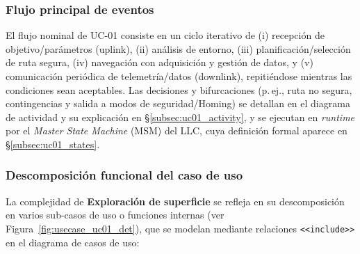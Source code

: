 \subsubsection{Flujo principal de eventos}\label{subsec:uc01_flow}

El flujo nominal de UC-01 consiste en un ciclo iterativo de (i) recepción de objetivo/parámetros (uplink), (ii) análisis de entorno, (iii) planificación/selección de ruta segura, (iv) navegación con adquisición y gestión de datos, y (v) comunicación periódica de telemetría/datos (downlink), repitiéndose mientras las condiciones sean aceptables. Las decisiones y bifurcaciones (p.\,ej., ruta no segura, contingencias y salida a modos de seguridad/Homing) se detallan en el diagrama de actividad y su explicación en \S\ref{subsec:uc01_activity}, y se ejecutan en \emph{runtime} por el \emph{Master State Machine} (MSM) del LLC, cuya definición formal aparece en \S\ref{subsec:uc01_states}.

\subsubsection{Descomposición funcional del caso de uso}

La complejidad de \textbf{Exploración de superficie} se refleja en su descomposición en varios sub-casos de uso
o funciones internas (ver Figura~\ref{fig:usecase_uc01_det}), que se modelan mediante relaciones \texttt{\textless\textless include\textgreater\textgreater} en el diagrama de casos de uso:

